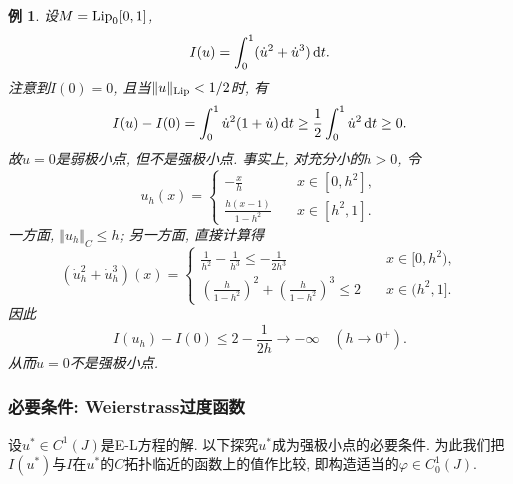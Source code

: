 \documentclass[12pt,a4paper]{article}
\newtheorem{example}[theorem]{例}
\begin{document}
\begin{example}
    设$M = {\rm Lip}_0[0, 1]$, 
    \begin{equation*}
        I(u)=\int_0^1(\dot u^2+\dot u^3) \,{\rm d}t.
    \end{equation*}
    注意到$I(0) = 0$, 且当$\Vert u \Vert_{{\rm Lip}} < 1/2$时, 有 
    \begin{equation*}
        I(u) - I(0) = \int_0^1\dot u^2(1 + \dot u) \,{\rm d}t \geq \frac{1}{2}\int_0^1\dot u^2 \,{\rm d}t \geq 0. 
    \end{equation*}
    故$u = 0$是弱极小点, 但不是强极小点. 事实上, 对充分小的$h > 0$, 令 
    \begin{equation*}
        u_h(x) =  
        \begin{cases} 
            \displaystyle-\frac{x}{h} \quad &x \in [0, h^2], \\  
            \displaystyle\frac{h(x - 1)}{1 - h^2} \quad &x \in [h^2, 1]. 
        \end{cases}
    \end{equation*}
    一方面, $\Vert u_h \Vert_C \leq h$; 另一方面, 直接计算得 
    \begin{equation} 
        (\dot u_h^2 + \dot u_h^3)(x) =  
        \begin{cases} 
            \displaystyle \frac{1}{h^2} - \frac{1}{h^3} \leq -\frac{1}{2h^3} \quad &x \in [0, h^2), \\  
            \displaystyle \left(\frac{h}{1 - h^2}\right)^2 + \left(\frac{h}{1 - h^2}\right)^3 \leq 2 \quad &x \in (h^2, 1]. 
        \end{cases} 
    \end{equation}
    因此
    \begin{equation*}
        I(u_h) - I(0) \leq 2 - \frac{1}{2h} \rightarrow -\infty \quad (h \rightarrow 0^+).
    \end{equation*}
    从而$u = 0$不是强极小点.
\end{example}

\subsubsection{必要条件: Weierstrass过度函数}

设$u^* \in C^1(J)$是E-L方程的解. 以下探究$u^*$成为强极小点的必要条件.
为此我们把$I(u^*)$与$I$在$u^*$的$C$拓扑临近的函数上的值作比较, 即构造适当的$\varphi \in C_0^1(J)$.
\end{document}
